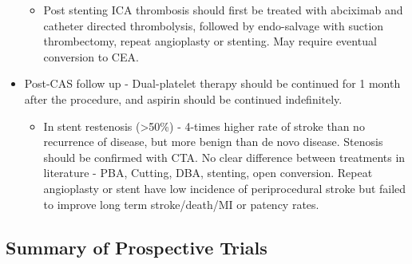 \documentclass[
]{book}
\providecommand{\tightlist}{%
  \setlength{\itemsep}{0pt}\setlength{\parskip}{0pt}}
\begin{document}
\begin{itemize}
  \begin{itemize}
  \tightlist
  \item
    Post stenting ICA thrombosis should first be treated with
    abciximab and catheter directed thrombolysis, followed by
    endo-salvage with suction thrombectomy, repeat angioplasty or
    stenting. May require eventual conversion to CEA.\citep{coelho2019, naylor2018}
  \end{itemize}
\item
  Post-CAS follow up - Dual-platelet therapy should be continued for 1
  month after the procedure, and aspirin should be continued
  indefinitely.

  \begin{itemize}
  \tightlist
  \item
    In stent restenosis (\textgreater50\%) - 4-times higher rate of stroke than
    no recurrence of disease, but more benign than de novo
    disease.\citep{clavel2019} Stenosis should be confirmed with CTA. No
    clear difference between treatments in literature - PBA,
    Cutting, DBA, stenting, open conversion.\citep{arhuidese2017} Repeat
    angioplasty or stent have low incidence of periprocedural stroke
    but failed to improve long term stroke/death/MI or patency
    rates.\citep{chungPercutaneousInterventionCarotid2016a}
  \end{itemize}
\end{itemize}

\hypertarget{summary-of-prospective-trials}{%
\subsection{Summary of Prospective Trials}\label{summary-of-prospective-trials}}
\end{document}
